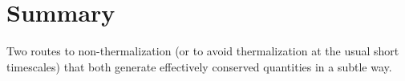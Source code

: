 \chapter{Summary}\label{ch:summary}
Two routes to non-thermalization (or to avoid thermalization at the usual short timescales) that both generate effectively conserved quantities in a subtle way.